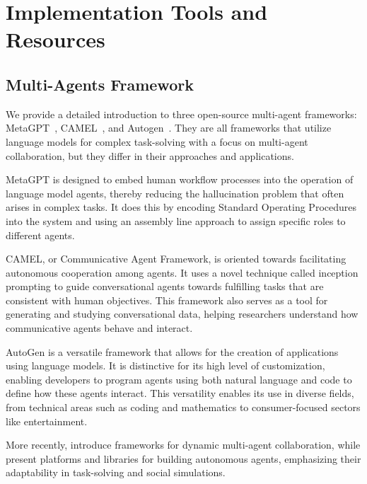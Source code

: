 \section{Implementation Tools and Resources}
\label{Sec4:Framework}
\subsection{Multi-Agents Framework}



We provide a detailed introduction to three open-source multi-agent frameworks: MetaGPT~\cite{hong2023metagpt}, CAMEL~\cite{li2023camel}, and Autogen~\cite{wu2023autogen}.
They are all frameworks that utilize language models for complex task-solving with a focus on multi-agent collaboration, but they differ in their approaches and applications.

MetaGPT is designed to embed human workflow processes into the operation of language model agents, thereby reducing the hallucination problem that often arises in complex tasks. 
It does this by encoding Standard Operating Procedures into the system and using an assembly line approach to assign specific roles to different agents. 

CAMEL, or Communicative Agent Framework, is oriented towards facilitating autonomous cooperation among agents. It uses a novel technique called inception prompting to guide conversational agents towards fulfilling tasks that are consistent with human objectives. This framework also serves as a tool for generating and studying conversational data, helping researchers understand how communicative agents behave and interact.

AutoGen is a versatile framework that allows for the creation of applications using language models. 
It is distinctive for its high level of customization, enabling developers to program agents using both natural language and code to define how these agents interact. 
This versatility enables its use in diverse fields, from technical areas such as coding and mathematics to consumer-focused sectors like entertainment.

More recently, \cite{chen2023agentverse,chen2023autoagents} introduce frameworks for dynamic multi-agent collaboration, while \cite{zhou2023agents,li2023metaagents,xie2023openagents} present platforms and libraries for building autonomous agents, emphasizing their adaptability in task-solving and social simulations.

